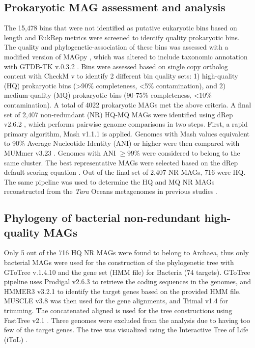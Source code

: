 \documentclass[12pt]{article}
\numberwithin{equation}{section}
\begin{document}
\subsection*{Prokaryotic MAG assessment and analysis} 
The 15,478 bins that were not identified as putative eukaryotic bins based on length and EukRep metrics were screened to identify quality prokaryotic bins. The quality and phylogenetic-association of these bins was assessed with a modified version of MAGpy \citep{Stewart2019MAGpy}, which was altered to include taxonomic annotation with GTDB-TK v.0.3.2 \citep{Chaumeil_2019}. Bins were assessed based on single copy ortholog content with CheckM v \citep{Parks2015CheckM} to identify 2 different bin quality sets: 1) high-quality (HQ) prokaryotic bins (>90\% completeness, <5\% contamination), and 2) medium-quality (MQ) prokaryotic bins (90-75\% completeness, <10\% contamination). A total of 4022 prokaryotic MAGs met the above criteria. A final set of 2,407 non-redundant (NR) HQ-MQ MAGs were identified using dRep v2.6.2 \citep{Olm_2017}, which performs pairwise genome comparisons in two steps. First, a rapid primary algorithm, Mash v1.1.1 \citep{Ondov_2016} is applied. Genomes with Mash values equivalent to 90\% Average Nucleotide Identity (ANI) or higher were then compared with MUMmer v3.23 \citep{Mar_ais_2018}. Genomes with ANI $\geq99\%$ were considered to belong to the same cluster. The best representative MAGs were selected based on the dRep default scoring equation \citep{Olm_2017}. Out of the final set of 2,407 NR MAGs, 716 were HQ. The same pipeline was used to determine the HQ and MQ NR MAGs reconstructed from the \textit{Tara} Oceans metagenomes in previous studies \citep{Tully2018reconstruction, Parks2017Recovery, Delmont2018Nitrogen-fixing}. 

\subsection*{Phylogeny of bacterial non-redundant high-quality MAGs}
Only 5 out of the 716 HQ NR MAGs were found to belong to Archaea, thus only bacterial MAGs were used for the construction of the phylogenetic tree with GToTree v.1.4.10 \citep{Lee_2019} and the gene set (HMM file) for Bacteria (74 targets). GToTree pipeline uses Prodigal v2.6.3 \citep{Hyatt_2010} to retrieve the coding sequences in the genomes, and HMMER3 v3.2.1 \citep{Eddy_2011} to identify the target genes based on the provided HMM file. MUSCLE v3.8 \citep{Edgar_2004} was then used for the gene alignments, and Trimal v1.4  \citep{Capella_Gutierrez_2009} for trimming. The concatenated aligned is used for the tree constructions using FastTree v2.1 \citep{Price_2010}. Three genomes were excluded from the analysis due to having too few of the target genes. The tree was visualized using the Interactive Tree of Life (iToL) \citep{Letunic2016Interactive}.
\end{document}
